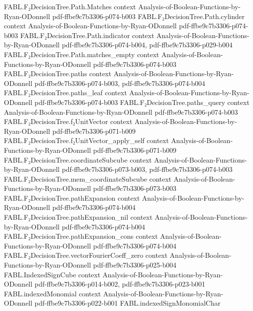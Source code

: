 \begin{theorem}
\proofstep
  {FABL.F₂DecisionTree.Path.Matches}
  {context}
  {Analysis-of-Boolean-Functions-by-Ryan-ODonnell}
  {pdf-ffbe9c7b3306-p074-b003}
\proofstep
  {FABL.F₂DecisionTree.Path.cylinder}
  {context}
  {Analysis-of-Boolean-Functions-by-Ryan-ODonnell}
  {pdf-ffbe9c7b3306-p074-b003}
\proofstep
  {FABL.F₂DecisionTree.Path.indicator}
  {context}
  {Analysis-of-Boolean-Functions-by-Ryan-ODonnell}
  {pdf-ffbe9c7b3306-p074-b004,
    pdf-ffbe9c7b3306-p029-b004}
\proofstep
  {FABL.F₂DecisionTree.Path.matches_empty}
  {context}
  {Analysis-of-Boolean-Functions-by-Ryan-ODonnell}
  {pdf-ffbe9c7b3306-p074-b003}
\proofstep
  {FABL.F₂DecisionTree.paths}
  {context}
  {Analysis-of-Boolean-Functions-by-Ryan-ODonnell}
  {pdf-ffbe9c7b3306-p074-b003,
    pdf-ffbe9c7b3306-p074-b004}
\proofstep
  {FABL.F₂DecisionTree.paths_leaf}
  {context}
  {Analysis-of-Boolean-Functions-by-Ryan-ODonnell}
  {pdf-ffbe9c7b3306-p074-b003}
\proofstep
  {FABL.F₂DecisionTree.paths_query}
  {context}
  {Analysis-of-Boolean-Functions-by-Ryan-ODonnell}
  {pdf-ffbe9c7b3306-p074-b003}
\proofstep
  {FABL.F₂DecisionTree.f₂UnitVector}
  {context}
  {Analysis-of-Boolean-Functions-by-Ryan-ODonnell}
  {pdf-ffbe9c7b3306-p071-b009}
\proofstep
  {FABL.F₂DecisionTree.f₂UnitVector_apply_self}
  {context}
  {Analysis-of-Boolean-Functions-by-Ryan-ODonnell}
  {pdf-ffbe9c7b3306-p071-b009}
\proofstep
  {FABL.F₂DecisionTree.coordinateSubcube}
  {context}
  {Analysis-of-Boolean-Functions-by-Ryan-ODonnell}
  {pdf-ffbe9c7b3306-p073-b003,
    pdf-ffbe9c7b3306-p074-b003}
\proofstep
  {FABL.F₂DecisionTree.mem_coordinateSubcube}
  {context}
  {Analysis-of-Boolean-Functions-by-Ryan-ODonnell}
  {pdf-ffbe9c7b3306-p073-b003}
\proofstep
  {FABL.F₂DecisionTree.pathExpansion}
  {context}
  {Analysis-of-Boolean-Functions-by-Ryan-ODonnell}
  {pdf-ffbe9c7b3306-p074-b004}
\proofstep
  {FABL.F₂DecisionTree.pathExpansion_nil}
  {context}
  {Analysis-of-Boolean-Functions-by-Ryan-ODonnell}
  {pdf-ffbe9c7b3306-p074-b004}
\proofstep
  {FABL.F₂DecisionTree.pathExpansion_cons}
  {context}
  {Analysis-of-Boolean-Functions-by-Ryan-ODonnell}
  {pdf-ffbe9c7b3306-p074-b004}
\proofstep
  {FABL.F₂DecisionTree.vectorFourierCoeff_zero}
  {context}
  {Analysis-of-Boolean-Functions-by-Ryan-ODonnell}
  {pdf-ffbe9c7b3306-p025-b004}
\proofstep
  {FABL.IndexedSignCube}
  {context}
  {Analysis-of-Boolean-Functions-by-Ryan-ODonnell}
  {pdf-ffbe9c7b3306-p014-b002,
    pdf-ffbe9c7b3306-p023-b001}
\proofstep
  {FABL.indexedMonomial}
  {context}
  {Analysis-of-Boolean-Functions-by-Ryan-ODonnell}
  {pdf-ffbe9c7b3306-p022-b001}
\proofstep
  {FABL.indexedSignMonomialChar}

\end{theorem}
